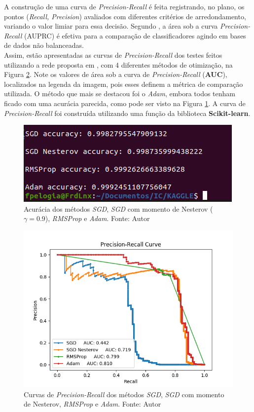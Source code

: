 \documentclass[a4paper,12pt]{article}
\begin{document}
A construção de uma curva de \textit{Precision-Recall} é feita registrando, no plano, os pontos (\textit{Recall, Precision}) avaliados com diferentes critérios de arredondamento, variando o valor limiar para essa decisão. Segundo \cite{PRC}, a área sob a curva \textit{Precision-Recall} (AUPRC) é efetiva para a comparação de classificadores agindo em bases de dados não balanceadas.\\

Assim, estão apresentadas as curvas de \textit{Precision-Recall} dos testes feitos utilizando a rede proposta em \cite{caraInternet}, com 4 diferentes métodos de otimização, na Figura \ref{fig:PRC}. Note os valores de área sob a curva de \textit{Precision-Recall} (\textbf{AUC}), localizados na legenda da imagem, pois esses definem a métrica de comparação utilizada. O método que mais se destacou foi o \textit{Adam}, embora todos tenham ficado com uma acurácia parecida, como pode ser visto na Figura \ref{fig:Acc}. A curva de \textit{Precision-Recall} foi construída utilizando uma função da biblioteca \textbf{Scikit-learn}. 

\begin{figure}[H]
\centering 
\includegraphics[scale=0.6]{Figuras/Acc.png}
\caption{Acurácia dos métodos \textit{SGD}, \textit{SGD} com momento de Nesterov ($\gamma = 0.9$), \textit{RMSProp} e \textit{Adam}. Fonte: Autor}
\label{fig:Acc}
\end{figure}



\begin{figure}[H]
\centering 
\includegraphics[scale=0.7]{Figuras/PRC.png}
\caption{Curvas de \textit{Precision-Recall} dos métodos \textit{SGD}, \textit{SGD} com momento de Nesterov, \textit{RMSProp} e \textit{Adam}. Fonte: Autor}
\label{fig:PRC}
\end{figure}
\end{document}
